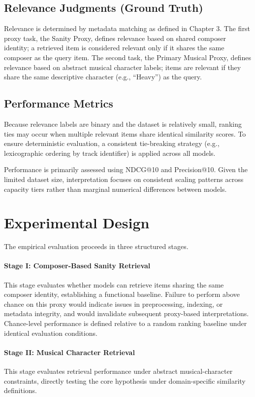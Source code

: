 \subsection{Relevance Judgments (Ground Truth)}
Relevance is determined by metadata matching as defined in Chapter 3. The first proxy task, the Sanity Proxy, defines relevance based on shared composer identity; a retrieved item is considered relevant only if it shares the same composer as the query item. The second task, the Primary Musical Proxy, defines relevance based on abstract musical character labels; items are relevant if they share the same descriptive character (e.g., ``Heavy'') as the query.

\subsection{Performance Metrics}

Because relevance labels are binary and the dataset is relatively small, ranking ties may occur when multiple relevant items share identical similarity scores. To ensure deterministic evaluation, a consistent tie-breaking strategy (e.g., lexicographic ordering by track identifier) is applied across all models.

Performance is primarily assessed using NDCG@10 and Precision@10. Given the limited dataset size, interpretation focuses on consistent scaling patterns across capacity tiers rather than marginal numerical differences between models.


\section{Experimental Design}
The empirical evaluation proceeds in three structured stages.

\paragraph{Stage I: Composer-Based Sanity Retrieval}
This stage evaluates whether models can retrieve items sharing the same composer identity, establishing a functional baseline.
Failure to perform above chance on this proxy would indicate issues in preprocessing, indexing, or metadata integrity, and would invalidate subsequent proxy-based interpretations.
Chance-level performance is defined relative to a random ranking baseline under identical evaluation conditions.

\paragraph{Stage II: Musical Character Retrieval}
This stage evaluates retrieval performance under abstract musical-character constraints, directly testing the core hypothesis under domain-specific similarity definitions.

